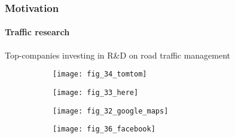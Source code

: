 \begin{frame}
\frametitle{Motivation}
\framesubtitle{Traffic research}
    Top-companies investing in R\&D on road traffic management
    \begin{figure}
      \begin{subfigure}[c]{.2\paperwidth}
      \centering
      \texttt{[image: fig\_34\_tomtom]}
      \end{subfigure}
      \begin{subfigure}[c]{.2\paperwidth}
      \centering
      \texttt{[image: fig\_33\_here]}
      \end{subfigure}
      \begin{subfigure}[c]{.2\paperwidth}
      \centering
      \texttt{[image: fig\_32\_google\_maps]}
      \end{subfigure}
      \begin{subfigure}[c]{.2\paperwidth}
      \centering
      \texttt{[image: fig\_36\_facebook]}
      \end{subfigure}
    \end{figure}
\end{frame}